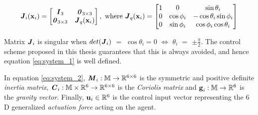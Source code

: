 \begin{equation}
  \bm{\mathit{J}}_i(\bm{\mathbf{x}}_i) =
  \begin{bmatrix}
    \bm{\mathit{I}}_3 & \bm{\mathit{0}}_{3 \times 3} \\
    \bm{\mathit{0}}_{3 \times 3} & \bm{\mathit{J}}_{ q }(\bm{\mathbf{x}}_i) \\
  \end{bmatrix} \notag, \text{ where }
  \bm{\mathit{J}}_q(\bm{\mathbf{x}}_i) =
  \begin{bmatrix}
    1 & 0 & \sin\theta_i \\
    0 & \cos\phi_i & -\cos\theta_i \sin\phi_i \\
    0 & \sin\phi_i & \cos\phi_i \cos\theta_i
  \end{bmatrix} \notag
\end{equation}

Matrix $\bm{\mathit{J}}_i$ is singular when $det(\bm{\mathit{J}}_i)$ $=$ $\cos\theta_i = 0$
$\Leftrightarrow$ $\theta_i$ $=$ $\pm \frac{\pi}{2}$. The control scheme
proposed in this thesis guarantees that this is always avoided, and hence
equation \eqref{eq:system_1} is well defined.

In equation \eqref{eq:system_2}, $\bm{\mathit{M}}_i:\mathbb{M} \to \mathbb{R}^{6\times6}$ is
the symmetric and positive definite \textit{inertia matrix},
$\bm{\mathit{C}}_i:\mathbb{M}\times\mathbb{R}^6 \to \mathbb{R}^{6\times6}$ is the
\textit{Coriolis matrix} and $\bm{\mathbf{g}}_i:\mathbb{M} \to \mathbb{R}^6$ is the
\textit{gravity vector}.
Finally, $\bm{\mathbf{u}}_i\in\mathbb{R}^6$ is the control input vector representing
the $6$D generalized \textit{actuation force} acting on the agent.




